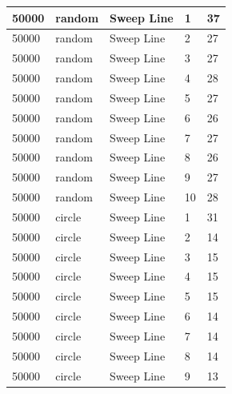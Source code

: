 \documentclass[12pt]{article}
\begin{document}
\begin{longtable}{|l|l|l|l|l|}
50000        & random            & Sweep Line & 1          & 37                            \\ \hline
50000        & random            & Sweep Line & 2          & 27                            \\ \hline
50000        & random            & Sweep Line & 3          & 27                            \\ \hline
50000        & random            & Sweep Line & 4          & 28                            \\ \hline
50000        & random            & Sweep Line & 5          & 27                            \\ \hline
50000        & random            & Sweep Line & 6          & 26                            \\ \hline
50000        & random            & Sweep Line & 7          & 27                            \\ \hline
50000        & random            & Sweep Line & 8          & 26                            \\ \hline
50000        & random            & Sweep Line & 9          & 27                            \\ \hline
50000        & random            & Sweep Line & 10         & 28                            \\ \hline
50000        & circle            & Sweep Line & 1          & 31                            \\ \hline
50000        & circle            & Sweep Line & 2          & 14                            \\ \hline
50000        & circle            & Sweep Line & 3          & 15                            \\ \hline
50000        & circle            & Sweep Line & 4          & 15                            \\ \hline
50000        & circle            & Sweep Line & 5          & 15                            \\ \hline
50000        & circle            & Sweep Line & 6          & 14                            \\ \hline
50000        & circle            & Sweep Line & 7          & 14                            \\ \hline
50000        & circle            & Sweep Line & 8          & 14                            \\ \hline
50000        & circle            & Sweep Line & 9          & 13                            \\ \hline

\end{longtable}
\end{document}
